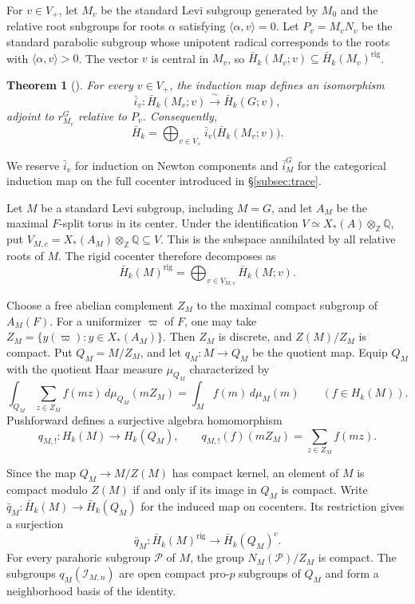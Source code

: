 \documentclass[11pt,letterpaper]{amsart}
\newtheorem{theorem}{Theorem}
\theoremstyle{definition}
\numberwithin{equation}{section}
\numberwithin{theorem}{section}
\newcommand{\kk}{k}
\newcommand{\ZZ}{\mathbb Z}
\newcommand{\QQ}{\mathbb Q}
\newcommand{\CI}{\mathcal I}
\newcommand{\rig}{\mathrm{rig}}
\begin{document}
For $v\in V_+$, let $M_v$ be the standard Levi
subgroup generated by $M_0$ and the relative root
subgroups for roots $\alpha$ satisfying
$\langle\alpha,v\rangle=0$. Let $P_v=M_vN_v$ be the
standard parabolic subgroup whose unipotent radical
corresponds to the roots with $\langle\alpha,v\rangle>0$.
The vector $v$ is central in $M_v$, so
$\bar H_\kk(M_v;v)\subseteq\bar H_\kk(M_v)^{\rig}$.

\begin{theorem}[{\cite[Theorems~A--C]{HeII}}]
\label{thm:newton-kernel-reduction}
For every $v\in V_+$, the induction map defines an
isomorphism
\[
 \bar i_v:\bar H_\kk(M_v;v)
       \xrightarrow{\ \sim\ }\bar H_\kk(G;v),
\]
adjoint to $r_{M_v}^G$ relative to $P_v$.
Consequently,
\[
 \bar H_\kk
   =\bigoplus_{v\in V_+}
      \bar i_v\bigl(\bar H_\kk(M_v;v)\bigr).
\]
\end{theorem}

We reserve $\bar i_v$ for induction on Newton components
and $\bar i_M^G$ for the categorical induction map on
the full cocenter introduced in \S\ref{subsec:trace}.

Let $M$ be a standard Levi subgroup, including
$M=G$, and let $A_M$ be the maximal $F$-split torus in
its center. Under the identification
$V\simeq X_*(A)\otimes_\ZZ\QQ$, put
$V_{M,c}=X_*(A_M)\otimes_\ZZ\QQ\subseteq V$.
This is the subspace annihilated by all relative roots of $M$. The rigid cocenter therefore decomposes as
\[
 \bar H_\kk(M)^{\rig}
   =\bigoplus_{v\in V_{M,c}}\bar H_\kk(M;v).
\]

Choose a free abelian complement $Z_M$ to the
maximal compact subgroup of $A_M(F)$. For a uniformizer
$\varpi$ of $F$, one may take
$Z_M=\{y(\varpi):y\in X_*(A_M)\}$.
Then $Z_M$ is discrete, and $Z(M)/Z_M$ is compact.
Put $Q_M=M/Z_M$, and let $q_M:M\to Q_M$ be the quotient
map. Equip $Q_M$ with the quotient Haar measure
$\mu_{Q_M}$ characterized by
\[
 \int_{Q_M}\sum_{z\in Z_M}f(mz)\,d\mu_{Q_M}(mZ_M)
   =\int_M f(m)\,d\mu_M(m)
 \qquad(f\in H_\kk(M)).
\]
Pushforward defines a surjective algebra homomorphism
\[
 q_{M,!}:H_\kk(M)\longrightarrow H_\kk(Q_M),
 \qquad
 q_{M,!}(f)(mZ_M)=\sum_{z\in Z_M}f(mz).
\]

Since the map $Q_M\to M/Z(M)$ has compact kernel, an element of $M$ is compact modulo $Z(M)$ if and only if its image in $Q_M$ is compact. Write $\bar q_M:\bar H_\kk(M)\to\bar H_\kk(Q_M)$ for the induced map on cocenters. Its restriction gives a surjection
\[
 \bar q_M:\bar H_\kk(M)^{\rig}
      \longrightarrow\bar H_\kk(Q_M)^c.
\]
For every parahoric subgroup $\mathcal P$ of $M$,
the group $N_M(\mathcal P)/Z_M$ is compact.
The subgroups $q_M(\CI_{M,n})$ are open compact pro-$p$
subgroups of $Q_M$ and form a neighborhood basis of
the identity.
\end{document}
